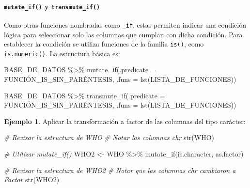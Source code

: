 \documentclass[
]{article}
\newenvironment{Shaded}{\begin{snugshade}}{\end{snugshade}}
\newcommand{\AttributeTok}[1]{\textcolor[rgb]{0.77,0.63,0.00}{#1}}
\newcommand{\CommentTok}[1]{\textcolor[rgb]{0.56,0.35,0.01}{\textit{#1}}}
\newcommand{\FunctionTok}[1]{\textcolor[rgb]{0.00,0.00,0.00}{#1}}
\newcommand{\NormalTok}[1]{#1}
\newcommand{\OtherTok}[1]{\textcolor[rgb]{0.56,0.35,0.01}{#1}}
\newcommand{\SpecialCharTok}[1]{\textcolor[rgb]{0.00,0.00,0.00}{#1}}
\theoremstyle{definition}
\theoremstyle{definition}
\newtheorem{example}{Ejemplo}[section]
\theoremstyle{definition}
\theoremstyle{definition}
\theoremstyle{remark}
\begin{document}
\hypertarget{mutate_if-y-transmute_if}{%
\paragraph{\texorpdfstring{\texttt{mutate\_if()} y \texttt{transmute\_if()}}{mutate\_if() y transmute\_if()}}\label{mutate_if-y-transmute_if}}

Como otras funciones nombradas como \texttt{\_if}, estas permiten indicar una condición lógica para seleccionar solo las columnas que cumplan con dicha condición. Para establecer la condición se utiliza funciones de la familia \texttt{is()}, como \texttt{is.numeric()}. La estructura básica es:

\begin{Shaded}
\begin{Highlighting}[]
\NormalTok{BASE\_DE\_DATOS }\SpecialCharTok{\%\textgreater{}\%} 
  \FunctionTok{mutate\_if}\NormalTok{(}\AttributeTok{.predicate =}\NormalTok{ FUNCIÓN\_IS\_SIN\_PARÉNTESIS,}
               \AttributeTok{.funs =} \FunctionTok{lst}\NormalTok{(LISTA\_DE\_FUNCIONES))}

\NormalTok{BASE\_DE\_DATOS }\SpecialCharTok{\%\textgreater{}\%} 
  \FunctionTok{transmute\_if}\NormalTok{(}\AttributeTok{.predicate =}\NormalTok{ FUNCIÓN\_IS\_SIN\_PARÉNTESIS,}
               \AttributeTok{.funs =} \FunctionTok{lst}\NormalTok{(LISTA\_DE\_FUNCIONES))}
\end{Highlighting}
\end{Shaded}

\begin{example}

Aplicar la transformación a factor de las columnas del tipo carácter:

\begin{Shaded}
\begin{Highlighting}[]
\CommentTok{\# Revisar la estructura de WHO}
\CommentTok{\# Notar las columnas chr}
\FunctionTok{str}\NormalTok{(WHO)}

\CommentTok{\# Utilizar mutate\_if()}
\NormalTok{WHO2 }\OtherTok{\textless{}{-}}\NormalTok{ WHO }\SpecialCharTok{\%\textgreater{}\%} 
  \FunctionTok{mutate\_if}\NormalTok{(is.character, as.factor)}

\CommentTok{\# Revisar la estructura de WHO2}
\CommentTok{\# Notar que las columnas chr cambiaron a Factor }
\FunctionTok{str}\NormalTok{(WHO2)}
\end{Highlighting}
\end{Shaded}

\end{example}
\end{document}
